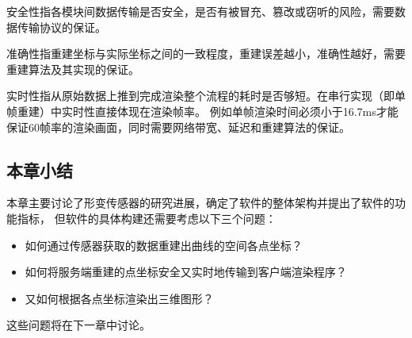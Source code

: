安全性指各模块间数据传输是否安全，是否有被冒充、篡改或窃听的风险，需要数据传输协议的保证。

准确性指重建坐标与实际坐标之间的一致程度，重建误差越小，准确性越好，需要重建算法及其实现的保证。

实时性指从原始数据上推到完成渲染整个流程的耗时是否够短。在串行实现（即单帧重建）中实时性直接体现在渲染帧率。
例如单帧渲染时间必须小于16.7ms才能保证60帧率的渲染画面，同时需要网络带宽、延迟和重建算法的保证。

\subsection{本章小结}
本章主要讨论了形变传感器的研究进展，确定了软件的整体架构并提出了软件的功能指标，
但软件的具体构建还需要考虑以下三个问题：

\begin{itemize}
\item 如何通过传感器获取的数据重建出曲线的空间各点坐标？
\item 如何将服务端重建的点坐标安全又实时地传输到客户端渲染程序？
\item 又如何根据各点坐标渲染出三维图形？
\end{itemize}

这些问题将在下一章中讨论。

